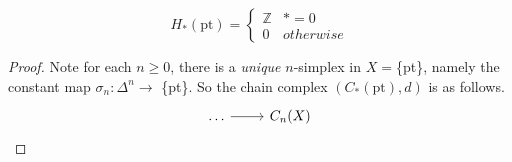 \documentclass{article}
\begin{document}
\begin{lemma}
  \begin{equation*}
    H_*(\text{pt}) =
    \begin{cases*}
      \mathbb{Z} & * = 0\\
      0 & otherwise
    \end{cases*}
  \end{equation*}
\end{lemma}
\begin{proof}
  Note for each $n \geq0$, there is a \emph{unique} $n$-simplex in $X = $\{pt\}, namely the constant map $\sigma_n: \Delta^n \to $ \{pt\}.
  So the chain complex $(C_*(\text{pt}), d)$ is as follows.
  \begin{equation*}
    \begin{tikzcd}
      \dots \rar & C_n(X)
    \end{tikzcd}
  \end{equation*}
\end{proof}
\end{document}
